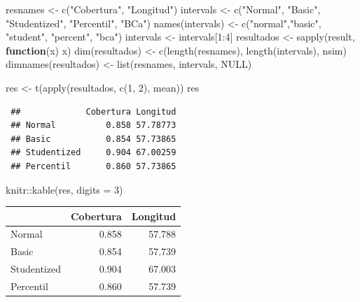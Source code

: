 \documentclass[
]{book}
\newenvironment{Shaded}{\begin{snugshade}}{\end{snugshade}}
\newcommand{\AttributeTok}[1]{\textcolor[rgb]{0.77,0.63,0.00}{#1}}
\newcommand{\ConstantTok}[1]{\textcolor[rgb]{0.00,0.00,0.00}{#1}}
\newcommand{\ControlFlowTok}[1]{\textcolor[rgb]{0.13,0.29,0.53}{\textbf{#1}}}
\newcommand{\DecValTok}[1]{\textcolor[rgb]{0.00,0.00,0.81}{#1}}
\newcommand{\FunctionTok}[1]{\textcolor[rgb]{0.00,0.00,0.00}{#1}}
\newcommand{\NormalTok}[1]{#1}
\newcommand{\OtherTok}[1]{\textcolor[rgb]{0.56,0.35,0.01}{#1}}
\newcommand{\SpecialCharTok}[1]{\textcolor[rgb]{0.00,0.00,0.00}{#1}}
\newcommand{\StringTok}[1]{\textcolor[rgb]{0.31,0.60,0.02}{#1}}
\theoremstyle{break}
\theoremstyle{nonumberplain}
\begin{document}
\begin{Shaded}
\begin{Highlighting}[]
\NormalTok{resnames }\OtherTok{\textless{}{-}} \FunctionTok{c}\NormalTok{(}\StringTok{"Cobertura"}\NormalTok{, }\StringTok{"Longitud"}\NormalTok{)}
\NormalTok{intervals }\OtherTok{\textless{}{-}} \FunctionTok{c}\NormalTok{(}\StringTok{"Normal"}\NormalTok{, }\StringTok{"Basic"}\NormalTok{, }\StringTok{"Studentized"}\NormalTok{, }\StringTok{"Percentil"}\NormalTok{, }\StringTok{"BCa"}\NormalTok{)}
\FunctionTok{names}\NormalTok{(intervals) }\OtherTok{\textless{}{-}} \FunctionTok{c}\NormalTok{(}\StringTok{"normal"}\NormalTok{,}\StringTok{"basic"}\NormalTok{, }\StringTok{"student"}\NormalTok{, }\StringTok{"percent"}\NormalTok{, }\StringTok{"bca"}\NormalTok{)}
\NormalTok{intervals }\OtherTok{\textless{}{-}}\NormalTok{ intervals[}\DecValTok{1}\SpecialCharTok{:}\DecValTok{4}\NormalTok{]}
\NormalTok{resultados }\OtherTok{\textless{}{-}} \FunctionTok{sapply}\NormalTok{(result, }\ControlFlowTok{function}\NormalTok{(x) x)}
\FunctionTok{dim}\NormalTok{(resultados) }\OtherTok{\textless{}{-}} \FunctionTok{c}\NormalTok{(}\FunctionTok{length}\NormalTok{(resnames), }\FunctionTok{length}\NormalTok{(intervals), nsim)}
\FunctionTok{dimnames}\NormalTok{(resultados) }\OtherTok{\textless{}{-}} \FunctionTok{list}\NormalTok{(resnames, intervals, }\ConstantTok{NULL}\NormalTok{)}

\NormalTok{res }\OtherTok{\textless{}{-}} \FunctionTok{t}\NormalTok{(}\FunctionTok{apply}\NormalTok{(resultados, }\FunctionTok{c}\NormalTok{(}\DecValTok{1}\NormalTok{, }\DecValTok{2}\NormalTok{), mean))}
\NormalTok{res}
\end{Highlighting}
\end{Shaded}

\begin{verbatim}
 ##             Cobertura Longitud
 ## Normal          0.858 57.78773
 ## Basic           0.854 57.73865
 ## Studentized     0.904 67.00259
 ## Percentil       0.860 57.73865
\end{verbatim}

\begin{Shaded}
\begin{Highlighting}[]
\NormalTok{knitr}\SpecialCharTok{::}\FunctionTok{kable}\NormalTok{(res, }\AttributeTok{digits =} \DecValTok{3}\NormalTok{)}
\end{Highlighting}
\end{Shaded}

\begin{tabular}{l|r|r}
\hline
  & Cobertura & Longitud\\
\hline
Normal & 0.858 & 57.788\\
\hline
Basic & 0.854 & 57.739\\
\hline
Studentized & 0.904 & 67.003\\
\hline
Percentil & 0.860 & 57.739\\
\hline
\end{tabular}
\end{document}
